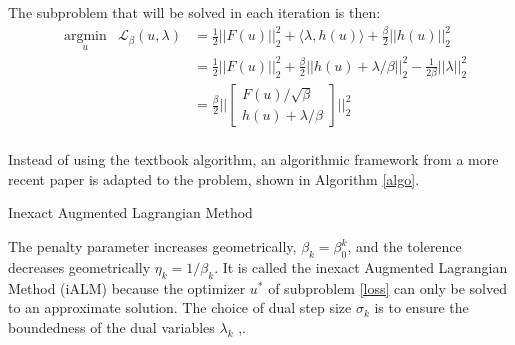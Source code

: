 The subproblem that will be solved in each iteration is then:
\begin{equation}
	\begin{aligned}
	 & \underset{u}{\text{argmin}} & \mathcal{L}_{\beta}(u,\lambda) 
	     &= \frac{1}{2} ||F(u)||^2_2 + \langle\lambda,h(u)\rangle + \frac{\beta}{2} || h(u) ||^2_2 \\
	 & & &= \frac{1}{2} ||F(u)||^2_2 + \frac{\beta}{2} ||h(u) + \lambda/\beta ||^2_2 - \frac{1}{2\beta} ||\lambda||^2_2 \\
	 & & &= \frac{\beta}{2} \Big|\Big|
		\begin{bmatrix}
			F(u)/\sqrt{\beta} \\
			h(u) + \lambda/\beta
		\end{bmatrix} \Big|\Big|^2_2 \\
	\end{aligned}
	\label{loss}
\end{equation}

Instead of using the textbook algorithm, an algorithmic framework from a more recent paper\cite{sahin2019} is adapted to the problem, shown in Algorithm \ref{algo}.

\begin{algorithm}[H]
\SetAlgoLined
{}
 \caption{Inexact Augmented Lagrangian Method}
 \label{algo}
\end{algorithm}
The penalty parameter increases geometrically, $\beta_k = \beta_0^k$, and the tolerence decreases geometrically $\eta_k = 1/\beta_k$. It is called the inexact Augmented Lagrangian Method (iALM) because the optimizer $u^*$ of subproblem \ref{loss} can only be solved to an approximate solution.  The choice of dual step size $\sigma_k$ is to ensure the boundedness of the dual variables $\lambda_k$ \cite{sahin2019},\cite{bertsekas1976}. 


